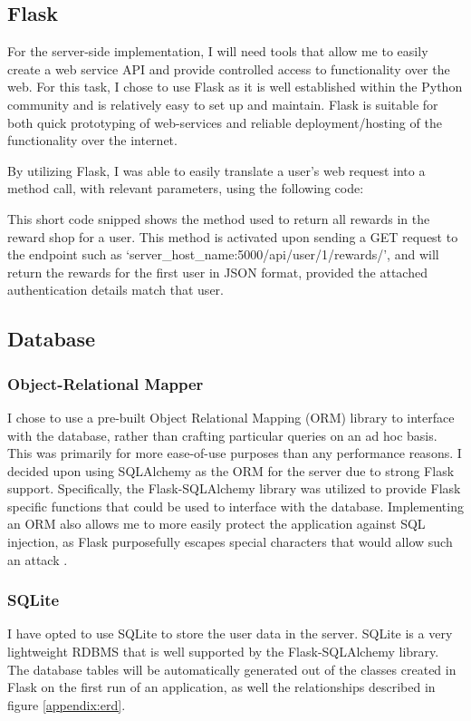 \subsection{Flask}
For the server-side implementation, I will need tools that allow me to easily create a web service API and provide controlled access to functionality over the web.
For this task, I chose to use Flask as it is well established within the Python community and is relatively easy to set up and maintain. 
Flask is suitable for both quick prototyping of web-services and reliable deployment/hosting of the functionality over the internet.

By utilizing Flask, I was able to easily translate a user's web request into a method call, with relevant parameters, using the following code:

This short code snipped shows the method used to return all rewards in the reward shop for a user.
This method is activated upon sending a GET request to the endpoint such as `server\_host\_name:5000/api/user/1/rewards/', and will return the rewards for the first user in JSON format, provided the attached authentication details match that user. 

\subsection{Database}
\subsubsection{Object-Relational Mapper}
I chose to use a pre-built Object Relational Mapping (ORM) library to interface with the database, rather than crafting particular queries on an ad hoc basis. 
This was primarily for more ease-of-use purposes than any performance reasons. 
I decided upon using SQLAlchemy as the ORM for the server due to strong Flask support.
Specifically, the Flask-SQLAlchemy library was utilized to provide Flask specific functions that could be used to interface with the database.
Implementing an ORM also allows me to more easily protect the application against SQL injection, as Flask purposefully escapes special characters that would allow such an attack \citep[p.15]{copeland2008essential}.

\subsubsection{SQLite}
I have opted to use SQLite to store the user data in the server.
SQLite is a very lightweight RDBMS that is well supported by the Flask-SQLAlchemy library.
The database tables will be automatically generated out of the classes created in Flask on the first run of an application, as well the relationships described in figure \ref{appendix:erd}. 

